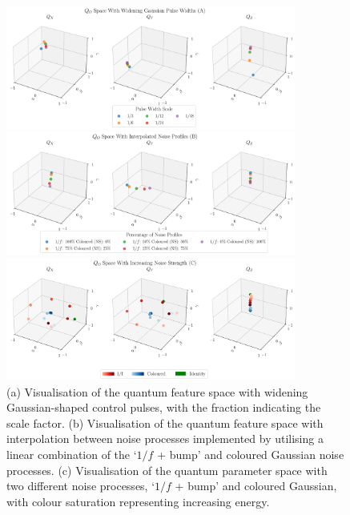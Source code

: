 \documentclass[12pt]{iopart}
\begin{document}
\begin{figure}
    \centering
    \includegraphics[width=0.85\textwidth]{figures/vis_widening_pulses.pdf}

    \vspace{1cm}

    \includegraphics[width=0.85\textwidth]{figures/vis_interpolated_noise_profiles.pdf}

    \vspace{1cm}

    \includegraphics[width=0.85\textwidth]{figures/vis_increasing_noise_str.pdf}
    \caption{(a) Visualisation of the quantum feature space with widening Gaussian-shaped control pulses, with the fraction indicating the scale factor. (b) Visualisation of the quantum feature space with interpolation between noise processes implemented by utilising a linear combination of the `$1/f$ + bump' and coloured Gaussian noise processes. (c) Visualisation of the quantum parameter space with two different noise processes, `$1/f$ + bump' and coloured Gaussian, with colour saturation representing increasing energy.}
    \label{fig:vo_space_with_changing_parameters}
\end{figure}
\end{document}
